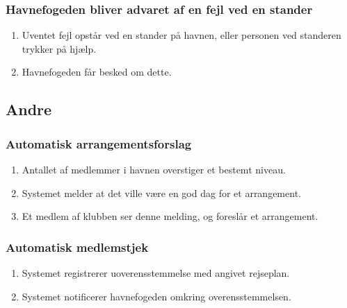     \subsubsection{Havnefogeden bliver advaret af en fejl ved en stander}
    \begin{enumerate}
      \item Uventet fejl opstår ved en stander på havnen, eller personen ved standeren trykker på hjælp.
      \item Havnefogeden får besked om dette.
    \end{enumerate}

\subsection{Andre}

    \subsubsection{Automatisk arrangementsforslag}

    \begin{enumerate}
      \item Antallet af medlemmer i havnen overstiger et bestemt niveau.
      \item Systemet melder at det ville være en god dag for et arrangement.
      \item Et medlem af klubben ser denne melding, og foreslår et arrangement.
    \end{enumerate}

    \subsubsection{Automatisk medlemstjek}

    \begin{enumerate}
      \item Systemet registrerer uoverensstemmelse med angivet rejseplan.
      \item Systemet notificerer havnefogeden omkring overensstemmelsen.
    \end{enumerate}


